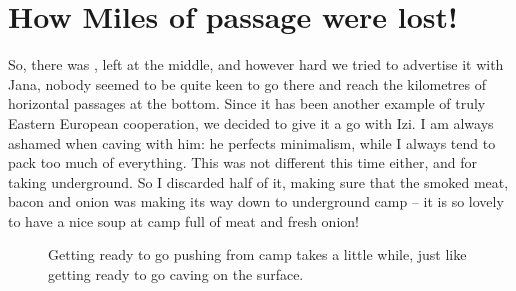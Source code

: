 
\section{How Miles of passage were lost!}

So, there was , left at the middle, and however
hard we tried to advertise it with Jana, nobody seemed to be quite keen
to go there and reach the kilometres of horizontal passages at the
bottom. Since it has been another example of truly Eastern European
cooperation, we decided to give it a go with Izi. I am always ashamed
when caving with him: he perfects minimalism, while I always tend to
pack too much of everything. This was not different this time either,
and  for taking underground. So I discarded half of it, making sure
that the smoked meat, bacon and onion was making its way down to
underground camp -- it is so lovely to have a nice soup at camp full of
meat and fresh onion!



\begin{figure}[t!]
\checkoddpage \ifoddpage \forcerectofloat \else \forceversofloat \fi
    \centering
        \caption{Getting ready to go pushing from camp takes a little while, just like getting ready to go caving on the surface. } \label{prepping to push}
\end{figure}


